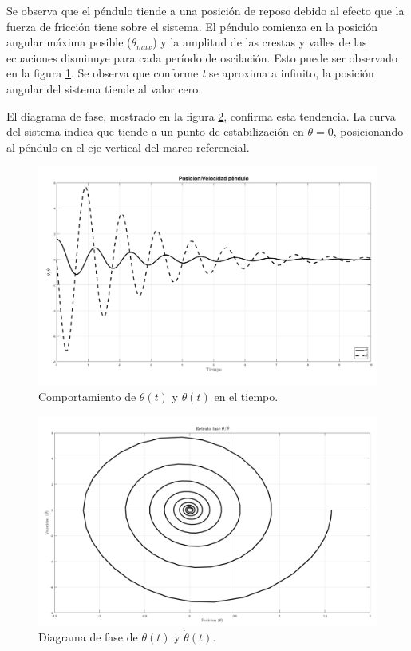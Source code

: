 Se observa que el péndulo tiende a una posición de reposo debido
al efecto que la fuerza de fricción tiene sobre el sistema.
El péndulo comienza en la posición angular máxima posible 
($\theta_{max}$) y la amplitud de las crestas y valles de las 
ecuaciones disminuye para cada período de oscilación. 
Esto puede ser observado en la figura \ref{fig: time plot theta dtheta friction}.
Se observa que conforme \emph{t} se aproxima a infinito, 
la posición angular del sistema tiende al valor cero.


El diagrama de fase, mostrado en la figura 
\ref{fig: phase plot theta friction}, confirma esta tendencia.
La curva del sistema indica que tiende 
a un punto de estabilización en $\theta = 0$,
posicionando al péndulo en el eje vertical 
del marco referencial.

\begin{figure}[hb!]
 \centering 
 \includegraphics[scale=0.3]{./img/PosVelF.png}
 \caption{Comportamiento de $\theta(t)$ y $\dot{\theta}(t)$ en el tiempo.}
 \label{fig: time plot theta dtheta friction}
\end{figure}

\begin{figure}[hb!]
 \centering 
 \includegraphics[scale=0.3]{./img/faseF.png}
\caption{Diagrama de fase de $\theta(t)$ y $\dot{\theta}(t)$.}
 \label{fig: phase plot theta friction}
\end{figure}
